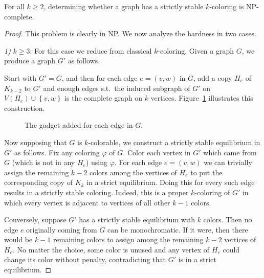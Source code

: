 \documentclass{llncs}
\begin{document}
\begin{theorem} 
For all $k \geq 2$, determining whether a graph has a strictly stable
$k$-coloring is NP-complete.  
\end{theorem}

\begin{proof}
This problem is clearly in NP.  We now analyze the hardness in two cases.

\noindent \emph{1)} $k\ge3$:
For this case we reduce from classical $k$-coloring.  Given a graph $G$, we
produce a graph $G'$ as follows.

Start with $G' = G$, and then for each edge $e = (v,w)$ in $G$, add a copy
$H_e$ of $K_{k-2}$ to $G'$ and enough edges s.t.\ the
induced subgraph of $G'$ on $V(H_e) \cup \left \{ v,w \right \}$
is the complete graph on $k$ vertices. Figure~\ref{fig:edgegadget} illustrates
this construction.

\begin{figure}[htb]
\centering
{}
\caption{The gadget added for each edge in $G$.}
\label{fig:edgegadget}
\end{figure}

Now supposing that $G$ is $k$-colorable, we construct a strictly stable
equilibrium in $G'$ as follows. Fix any coloring $\varphi$ of $G$. Color each
vertex in $G'$ which came from $G$ (which is not in any $H_e$) using $\varphi$.
For each edge $e = (v,w)$ we can trivially assign the remaining $k-2$ colors
among the vertices of $H_e$ to put the corresponding copy of $K_k$ in a strict
equilibrium. Doing this for every such edge results in a strictly stable
coloring. Indeed, this is a proper $k$-coloring of $G'$ in which every vertex
is adjacent to vertices of all other $k-1$ colors.

Conversely, suppose $G'$ has a strictly stable equilibrium with $k$ colors.
Then no edge $e$ originally coming from $G$ can be monochromatic. If it were,
then there would be $k-1$ remaining colors to assign among the remaining $k-2$
vertices of $H_e$. No matter the choice, some color is unused and any vertex
of $H_e$ could change its color without penalty, contradicting that
$G'$ is in a strict equilibrium.


\end{proof}
\end{document}

